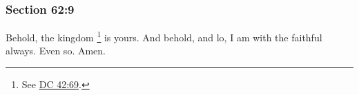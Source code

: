 
	\subsubsection{Section 62:9} %
		\label{DC62-9}

		Behold, the kingdom%
			\footnote{%
				See \hyperref[DC42-69]{DC 42:69}.
				}
		is yours.  And behold, and lo, I am with the faithful always.  Even so.  Amen.

